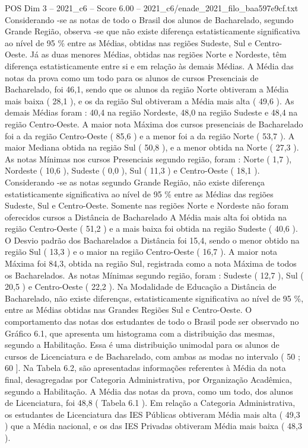 \begin{textsample}{POS Dim 3 – 2021\_c6 – Score 6.00 – 2021\_c6/enade\_2021\_filo\_baa597e9cf.txt}
Considerando -se as notas de todo o Brasil dos alunos de Bacharelado, segundo Grande Região, observa -se que não existe diferença estatisticamente significativa ao nível de 95 \% entre as Médias, obtidas nas regiões Sudeste, Sul e Centro-Oeste.
Já as duas menores Médias, obtidas nas regiões Norte e Nordeste, têm diferença estatisticamente entre si e em relação às demais Médias.
A Média das notas da prova como um todo para os alunos de cursos Presenciais de Bacharelado, foi 46,1, sendo que os alunos da região Norte obtiveram a Média mais baixa ( 28,1 ), e os da região Sul obtiveram a Média mais alta ( 49,6 ).
As demais Médias foram : 40,4 na região Nordeste, 48,0 na região Sudeste e 48,4 na região Centro-Oeste.
A maior nota Máxima dos cursos presenciais de Bacharelado foi a da região Centro-Oeste ( 85,6 ) e a menor foi a da região Norte ( 53,7 ).
A maior Mediana obtida na região Sul ( 50,8 ), e a menor obtida na Norte ( 27,3 ).
As notas Mínimas nos cursos Presenciais segundo região, foram : Norte ( 1,7 ), Nordeste ( 10,6 ), Sudeste ( 0,0 ), Sul ( 11,3 ) e Centro-Oeste ( 18,1 ).
Considerando -se as notas segundo Grande Região, não existe diferença estatisticamente significativa ao nível de 95 \% entre as Médias das regiões Sudeste, Sul e Centro-Oeste.
Somente nas regiões Norte e Nordeste não foram oferecidos cursos a Distância de Bacharelado A Média mais alta foi obtida na região Centro-Oeste ( 51,2 ) e a mais baixa foi obtida na região Sudeste ( 40,6 ).
O Desvio padrão dos Bacharelados a Distância foi 15,4, sendo o menor obtido na região Sul ( 13,3 ) e o maior na região Centro-Oeste ( 16,7 ).
A maior nota Máxima foi 84,3, obtida na região Sul, registrada como a nota Máxima de todos os Bacharelados.
As notas Mínimas segundo região, foram : Sudeste ( 12,7 ), Sul ( 20,5 ) e Centro-Oeste ( 22,2 ).
Na Modalidade de Educação a Distância de Bacharelado, não existe diferenças, estatisticamente significativa ao nível de 95 \%, entre as Médias obtidas nas Grandes Regiões Sul e Centro-Oeste.
O comportamento das notas dos estudantes de todo o Brasil pode ser observado no Gráfico 6.1, que apresenta um histograma com a distribuição das mesmas, segundo a Habilitação.
Essa é uma distribuição unimodal para os alunos de cursos de Licenciatura e de Bacharelado, com ambas as modas no intervalo ( 50 ; 60 ].
Na Tabela 6.2, são apresentadas informações referentes à Média da nota final, desagregadas por Categoria Administrativa, por Organização Acadêmica, segundo a Habilitação.
A Média das notas da prova, como um todo, dos alunos de Licenciatura, foi 48,8 ( Tabela 6.1 ).
Em relação a Categoria Administrativa, os estudantes de Licenciatura das IES Públicas obtiveram Média mais alta ( 49,3 ) que a Média nacional, e os das IES Privadas obtiveram Média mais baixa ( 48,3 ).

\end{textsample}
